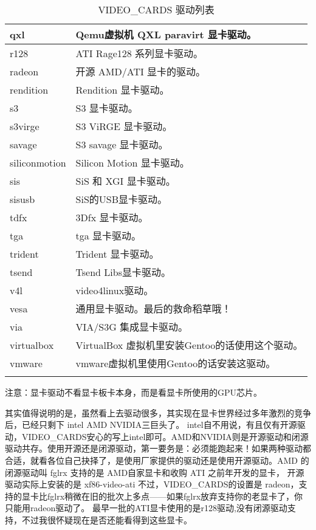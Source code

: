 \documentclass[amstex,twoside]{ctexbook}
\newenvironment{insertnote}{ \ttfamily\CJKfamily{KaiTi} }{\vskip 0.5cm }
\begin{document}
\begin{longtable}{|l|p{}|}
qxl & Qemu虚拟机 QXL paravirt 显卡驱动。\\\hline
r128 & ATI Rage128 系列显卡驱动。\\\hline
radeon & 开源 AMD/ATI 显卡的驱动。 \\\hline
rendition & Rendition 显卡驱动。\\\hline
s3 & S3 显卡驱动。\\\hline
s3virge & S3 ViRGE 显卡驱动。\\\hline
savage & S3 savage 显卡驱动。\\\hline
siliconmotion & Silicon Motion 显卡驱动。\\\hline
sis &  SiS 和 XGI 显卡驱动。\\\hline
sisusb & SiS的USB显卡驱动。\\\hline
tdfx & 3Dfx 显卡驱动。\\\hline
tga & tga 显卡驱动。 \\\hline
trident & Trident 显卡驱动。\\\hline
tsend & Tsend Libs显卡驱动。\\\hline
v4l & video4linux驱动。\\\hline
vesa & 通用显卡驱动。最后的救命稻草哦！\\\hline
via & VIA/S3G 集成显卡驱动。\\\hline
virtualbox & VirtualBox 虚拟机里安装Gentoo的话使用这个驱动。\\\hline
vmware & vmware虚拟机里使用Gentoo的话安装这驱动。\\\hline

\caption{VIDEO\_CARDS 驱动列表}\label{table:videocards}
\end{longtable}


\begin{insertnote}
注意：显卡驱动不看显卡板卡本身，而是看显卡所使用的GPU芯片。
\end{insertnote}


其实值得说明的是，虽然看上去驱动很多，其实现在显卡世界经过多年激烈的竞争后，已经只剩下 intel AMD NVIDIA三巨头了。
intel自不用说，有且仅有开源驱动，VIDEO\_CARDS安心的写上intel即可。AMD和NVIDIA则是开源驱动和闭源驱动共存。使用开源还是闭源驱动，第一要务是：必须能跑起来！如果两种驱动都合适，就看各位自己抉择了，是使用厂家提供的驱动还是使用开源驱动。AMD 的闭源驱动叫 fglrx 支持的是 AMD自家显卡和收购 ATI 之前年开发的显卡， 开源驱动实际上安装的是 xf86-video-ati 不过，VIDEO\_CARDS的设置是 radeon，支持的显卡比fglrx稍微在旧的批次上多点——如果fglrx放弃支持你的老显卡了，你只能用radeon驱动了。 最早一批的ATI显卡使用的是r128驱动,没有闭源驱动支持，不过我很怀疑现在是否还能看得到这些显卡。
\end{document}
